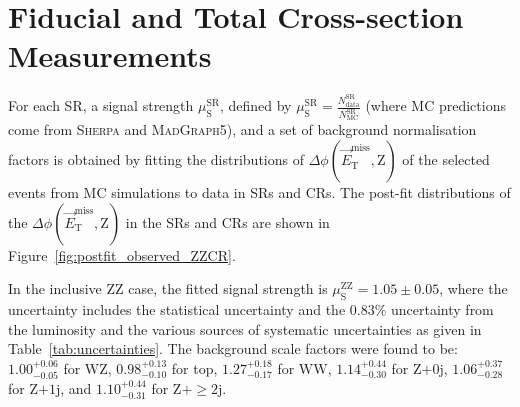 \section{Fiducial and Total Cross-section Measurements}

For each SR, a signal strength $\mu_{\text{S}}^{\text{SR}}$, defined by $\mu_{\text{S}}^{\text{SR}} = \frac{N^{\text{SR}}_{\text{data}}}{N^{\text{SR}}_{\text{MC}}}$ (where MC predictions come from \textsc{Sherpa} and \textsc{MadGraph5}),
and a set of background normalisation factors is obtained by fitting the distributions of $\Delta\phi(\vec{E}_{\text{T}}^{\text{miss}}, \text{Z})$ of the selected events from MC simulations to data in SRs and CRs. The post-fit distributions of the $\Delta\phi(\vec{E}_{\text{T}}^{\text{miss}}, \text{Z})$ in the SRs and CRs are shown in Figure~\ref{fig:postfit_observed_ZZCR}.
%

In the inclusive $\text{ZZ}$ case, the fitted signal strength is $\mu_{\text{S}}^{\text{ZZ}} = 1.05 \pm 0.05$, where the uncertainty includes the statistical uncertainty and the $0.83\%$ uncertainty from the luminosity and the 
various sources of systematic uncertainties as given in Table~\ref{tab:uncertainties}.
The background scale factors were found to be: $1.00^{+0.06}_{-0.05}$ for $\text{WZ}$, $0.98^{+0.13}_{-0.10}$ for top, $1.27^{+0.18}_{-0.17}$ for $\text{WW}$, 
$1.14^{+0.44}_{-0.30}$ for $\text{Z} \mathrm{+0j}$, 
$1.06^{+0.37}_{-0.28}$ for $\text{Z} \mathrm{+1j}$, 
and $1.10^{+0.44}_{-0.31}$ for $\text{Z} \mathrm{+\ge 2j}$.

